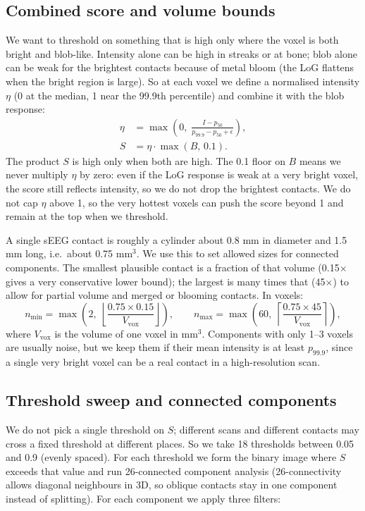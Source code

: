 \documentclass[11pt,a4paper]{article}
\begin{document}
\subsection{Combined score and volume bounds}
We want to threshold on something that is high only where the voxel is both bright and blob-like. Intensity alone can be high in streaks or at bone; blob alone can be weak for the brightest contacts because of metal bloom (the LoG flattens when the bright region is large). So at each voxel we define a normalised intensity \(\eta\) (0 at the median, 1 near the 99.9th percentile) and combine it with the blob response:
\begin{align}
\eta &= \max\left(0,\; \frac{I - p_{50}}{p_{99.9} - p_{50} + \epsilon}\right), \\
S &= \eta \cdot \max(B,\, 0.1).
\end{align}
The product \(S\) is high only when both are high. The 0.1 floor on \(B\) means we never multiply \(\eta\) by zero: even if the LoG response is weak at a very bright voxel, the score still reflects intensity, so we do not drop the brightest contacts. We do not cap \(\eta\) above 1, so the very hottest voxels can push the score beyond 1 and remain at the top when we threshold.

A single sEEG contact is roughly a cylinder about 0.8 mm in diameter and 1.5 mm long, i.e.\ about 0.75 mm\(^3\). We use this to set allowed sizes for connected components. The smallest plausible contact is a fraction of that volume (0.15\(\times\) gives a very conservative lower bound); the largest is many times that (45\(\times\)) to allow for partial volume and merged or blooming contacts. In voxels:
\[
n_{\min} = \max\left(2,\; \left\lfloor \frac{0.75 \times 0.15}{V_{\mathrm{vox}}} \right\rfloor\right), \qquad
n_{\max} = \max\left(60,\; \left\lceil \frac{0.75 \times 45}{V_{\mathrm{vox}}} \right\rceil\right),
\]
where \(V_{\mathrm{vox}}\) is the volume of one voxel in mm\(^3\). Components with only 1--3 voxels are usually noise, but we keep them if their mean intensity is at least \(p_{99.9}\), since a single very bright voxel can be a real contact in a high-resolution scan.

\subsection{Threshold sweep and connected components}
We do not pick a single threshold on \(S\); different scans and different contacts may cross a fixed threshold at different places. So we take 18 thresholds between 0.05 and 0.9 (evenly spaced). For each threshold we form the binary image where \(S\) exceeds that value and run 26-connected component analysis (26-connectivity allows diagonal neighbours in 3D, so oblique contacts stay in one component instead of splitting). For each component we apply three filters:
\end{document}

